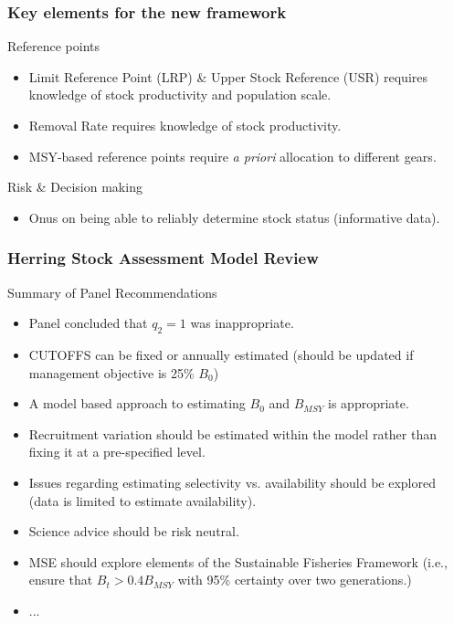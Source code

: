 \begin{frame}
	\frametitle{Key elements for the new framework}
	\begin{block}
		{Reference points}
		\begin{itemize}
			\item Limit Reference Point (LRP) \& Upper Stock Reference (USR) requires knowledge of stock productivity and population scale.
			\item Removal Rate requires knowledge of stock productivity.
			\item MSY-based reference points require \textit{a priori} allocation to different gears.
		\end{itemize}
	\end{block}
	\begin{block}
		{Risk \& Decision making}
		\begin{itemize}
			\item Onus on being able to reliably determine stock status (informative data).
		\end{itemize}
	\end{block}
\end{frame}
%
\begin{frame}
	\frametitle{Herring Stock Assessment Model Review}
	\begin{block}{Summary of Panel Recommendations}
		\begin{itemize}
			\item Panel concluded that $q_2=1$ was inappropriate.
			\item CUTOFFS can be fixed or annually estimated (should be updated if management objective is 25\% $B_0$)
			\item A model based approach to estimating $B_0$ and $B_{MSY}$ is appropriate.
			\item Recruitment variation should be estimated within the model rather than fixing it at a pre-specified level.
			\item Issues regarding estimating selectivity vs. availability should be explored (data is limited to estimate availability).
			\item Science advice should be risk neutral.
			\item MSE should explore elements of the Sustainable Fisheries Framework (i.e., ensure that $B_t>0.4B_{MSY}$ with 95\% certainty over two generations.)
			\item ...
		\end{itemize}
	\end{block}
\end{frame}
%

